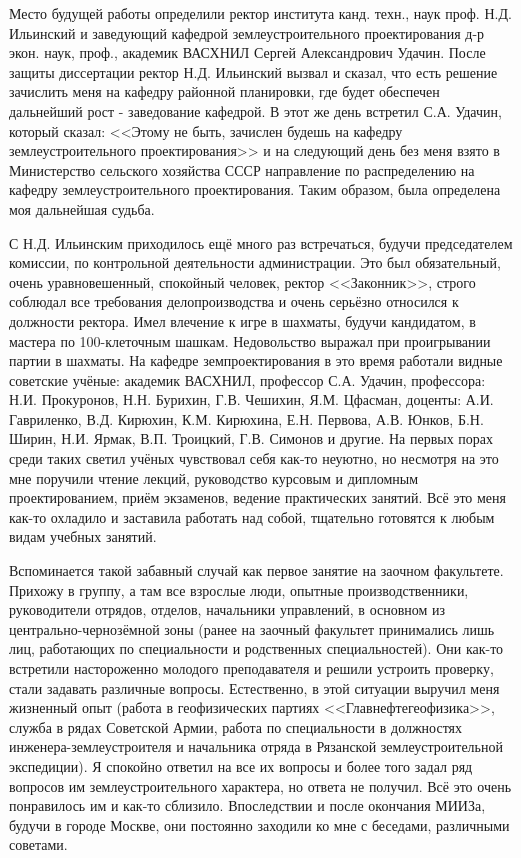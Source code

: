 Место будущей работы определили ректор института канд. техн., наук проф. Н.Д. Ильинский и заведующий кафедрой землеустроительного проектирования д-р экон. наук, проф., академик ВАСХНИЛ Сергей Александрович Удачин. После защиты диссертации ректор Н.Д. Ильинский вызвал и сказал, что есть решение зачислить меня на кафедру районной планировки, где будет обеспечен дальнейший рост - заведование кафедрой. В этот же день встретил С.А. Удачин, который сказал: <<Этому не быть, зачислен будешь на кафедру землеустроительного проектирования>> и на следующий день без меня взято в Министерство сельского хозяйства СССР направление по распределению на кафедру землеустроительного проектирования. Таким образом, была определена моя дальнейшая судьба. 

С Н.Д. Ильинским приходилось ещё много раз встречаться, будучи председателем комиссии, по контрольной деятельности администрации. Это был обязательный, очень уравновешенный, спокойный человек, ректор <<Законник>>, строго соблюдал все требования делопроизводства и очень серьёзно относился к должности ректора. Имел влечение к игре в шахматы, будучи кандидатом, в мастера по 100-клеточным шашкам. Недовольство выражал при проигрывании партии в шахматы. На кафедре земпроектирования в это время работали видные советские учёные: академик ВАСХНИЛ, профессор С.А. Удачин, профессора: Н.И. Прокуронов, Н.Н. Бурихин, Г.В. Чешихин, Я.М. Цфасман, доценты: А.И. Гавриленко, В.Д. Кирюхин, К.М. Кирюхина, Е.Н. Первова, А.В. Юнков, Б.Н. Ширин, Н.И. Ярмак, В.П. Троицкий, Г.В. Симонов и другие. На первых порах среди таких светил учёных чувствовал себя как-то неуютно, но несмотря на это мне поручили чтение лекций, руководство курсовым и дипломным проектированием, приём экзаменов, ведение практических занятий. Всё это меня как-то охладило и заставила работать над собой, тщательно готовятся к любым видам учебных занятий.

Вспоминается такой забавный случай как первое занятие на заочном факультете. Прихожу в группу, а там все взрослые люди, опытные производственники, руководители отрядов, отделов, начальники управлений, в основном из центрально-чернозёмной зоны (ранее на заочный факультет принимались лишь лиц, работающих по специальности и родственных специальностей). Они как-то встретили настороженно молодого преподавателя и решили устроить проверку, стали задавать различные вопросы. Естественно, в этой ситуации выручил меня жизненный опыт (работа в геофизических партиях <<Главнефтегеофизика>>, служба в рядах Советской Армии, работа по специальности в должностях инженера-землеустроителя и начальника отряда в Рязанской землеустроительной экспедиции). Я спокойно ответил на все их вопросы и более того задал ряд вопросов им землеустроительного характера, но ответа не получил. Всё это очень понравилось им и как-то сблизило. Впоследствии и после окончания МИИЗа, будучи в городе Москве, они постоянно заходили ко мне с беседами, различными советами. 

